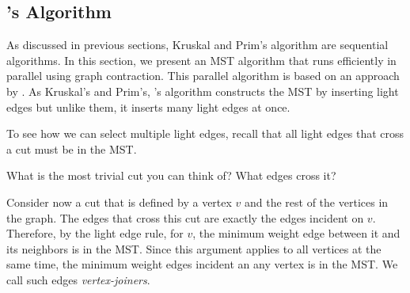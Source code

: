 \begin{comment}
\newcommand{\visitedx}{X}

\begin{pseudocode}[Prim's Algorithm]
\begin{codel}
\cfun~\cname{prim}(G) = \newl
\clet\newl
~~\cfun~\cname{enqueue}~v~(Q,(u, w)) = \cname{PQ.insert}~(w, (v,u))~Q\newlspace{.1in}
~~\cfun~\cname{prim'}(\visitedx,~Q,~T) =\newl
~~~~\ccase~\cname{PQ.deleteMin}(Q)~\cof\newl
~~~~~~~$\=$(\cnone, \cwild) \Rightarrow T~~~~~~~~~~~~~~~~~~~~~~~~\ccomment{Done}\newl
~~~~~|$\>$(\csome(d, (u, v)), Q') \Rightarrow\newl
~~~~~~~\cif~(v \in^? \visitedx)~\cthen~\cname{prim'}(\visitedx,~Q',~T)~~~~~~\cmark\ccomment{Already visited}\newl
~~~~~~~\celse~\clet\newl[line:insert]
~~~~~~~~~\cval~\visitedx' = \visitedx \cup \cset{v}\ctabc{Visit}\newl[line:add]
~~~~~~~~~\cval~T' = T \cup \cset{(u,v)}\ctabc{Add edge to MST}\newl
~~~~~~~~~\cval~Q'' = \citer~(\cname{enqueue}~v)~Q'~N_G(v)\ctabc{Enqueue $v$'s neighbors}\newl
~~~~~~~\cin~\cname{prim'}(\visitedx',~Q'',~T')~\cend\newlspace{.1in}
~~\cval~s = \ctext{an arbitrary vertex from $G$}\newl
~~\cval~Q = \citera{(\cname{enqueue}~s)}{\cset{}}{N_G(s)}\ctabc{Enqueue $s$'s neighbors}\newl
\cin\newl
~~\cname{prim'}(\cset{s},~Q,~\cset{})\newl
\cend
\end{codel}
\end{pseudocode}
\end{comment}


\subsection{\boruvka's Algorithm}


As discussed in previous sections, Kruskal and Prim's algorithm are
sequential algorithms. In this section, we present an MST algorithm
that runs efficiently in parallel using graph contraction.  This
parallel algorithm is based on an approach by \boruvka.  As Kruskal's
and Prim's, \boruvka's algorithm constructs the MST by inserting light
edges but unlike them, it inserts many light edges at once.

To see how we can select multiple light edges, recall that all light
edges that cross a cut must be in the MST.
%
\begin{question}
What is the most trivial cut you can think of?  What edges cross it?
\end{question}
%
Consider now a cut that is defined by a vertex $v$ and the rest of the
vertices in the graph.  
%
The edges that cross this cut are exactly the edges incident on $v$.
%
Therefore, by the light edge rule, for $v$, the minimum weight edge
between it and its neighbors is in the MST.
%
Since this argument applies to all vertices at the same time, the
minimum weight edges incident an any vertex is in the MST.  We call
such edges {\em vertex-joiners}.

